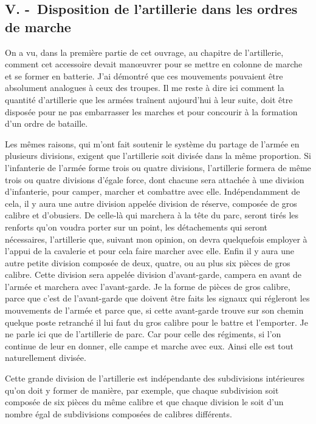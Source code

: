 \documentclass[french,twoside]{book} %
\begin{document}
\subsection[{V. - Disposition de l’artillerie dans les ordres de marche}]{V. - Disposition de l’artillerie dans les ordres de marche}
\noindent On a vu, dans la première partie de cet ouvrage, au chapitre de l’artillerie, comment cet accessoire devait manœuvrer pour se mettre en colonne de marche et se former en batterie. J’ai démontré que ces mouvements pouvaient être absolument analogues à ceux des troupes. Il me reste à dire ici comment la quantité d’artillerie que les armées traînent aujourd’hui à leur suite, doit être disposée pour ne pas embarrasser les marches et pour concourir à la formation d’un ordre de bataille.\par
Les mêmes raisons, qui m’ont fait soutenir le système du partage de l’armée en plusieurs divisions, exigent que l’artillerie soit divisée dans la même proportion. Si l’infanterie de l’armée forme trois ou quatre divisions, l’artillerie formera de même trois ou quatre divisions d’égale force, dont chacune sera attachée à une division d’infanterie, pour camper, marcher et combattre avec elle. Indépendamment de cela, il y aura une autre division appelée division de réserve, composée de gros calibre et d’obusiers. De celle-là qui marchera à la tête du parc, seront tirés les renforts qu’on voudra porter sur un point, les détachements qui seront nécessaires, l’artillerie que, suivant mon opinion, on devra quelquefois employer à l’appui de la cavalerie et pour cela faire marcher avec elle. Enfin il y aura une autre petite division composée de deux, quatre, ou au plus six pièces de gros calibre. Cette division sera appelée division d’avant-garde, campera en avant de l’armée et marchera avec l’avant-garde. Je la forme de pièces de gros calibre, parce que c’est de l’avant-garde que doivent être faits les signaux qui régleront les mouvements de l’armée et parce que, si cette avant-garde trouve sur son chemin quelque poste retranché il lui faut du gros calibre pour le battre et l’emporter. Je ne parle ici que de l’artillerie de parc. Car pour celle des régiments, si l’on continue de leur en donner, elle campe et marche avec eux. Ainsi elle est tout naturellement divisée.\par
Cette grande division de l’artillerie est indépendante des subdivisions intérieures qu’on doit y former de manière, par exemple, que chaque subdivision soit composée de six pièces du même calibre et que chaque division le soit d’un nombre égal de subdivisions composées de calibres différents.\par
\end{document}
